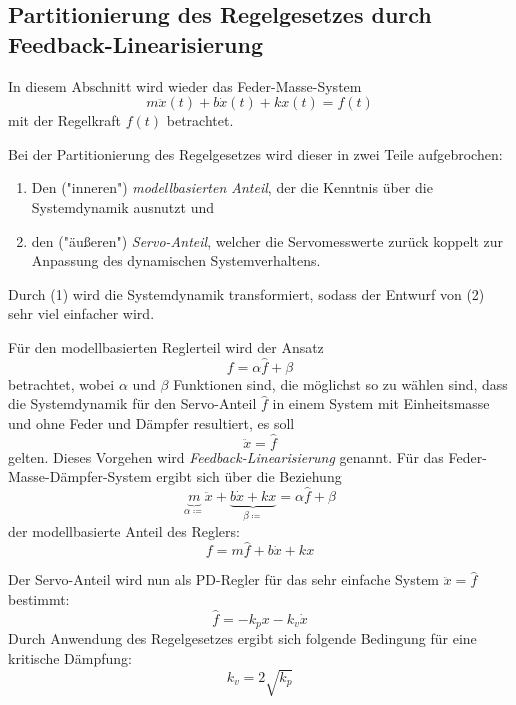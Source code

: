 		\subsection{Partitionierung des Regelgesetzes durch Feedback-Linearisierung}
			\label{sec:feedbacklinearization}

			In diesem Abschnitt wird wieder das Feder-Masse-System
			\begin{equation*}
				m\ddot{x}(t) + b\dot{x}(t) + kx(t) = f(t)
			\end{equation*}
			mit der Regelkraft \( f(t) \) betrachtet.

			Bei der Partitionierung des Regelgesetzes wird dieser in zwei Teile aufgebrochen:
			\begin{enumerate}
				\item Den ("inneren") \emph{modellbasierten Anteil}, der die Kenntnis über die Systemdynamik ausnutzt und
				\item den ("äußeren") \emph{Servo-Anteil}, welcher die Servomesswerte zurück koppelt zur Anpassung des dynamischen Systemverhaltens.
			\end{enumerate}
			Durch (1) wird die Systemdynamik transformiert, sodass der Entwurf von (2) sehr viel einfacher wird.

			Für den modellbasierten Reglerteil wird der Ansatz
			\begin{equation*}
				f = \alpha \hat{f} + \beta
			\end{equation*}
			betrachtet, wobei \( \alpha \) und \( \beta \) Funktionen sind, die möglichst so zu wählen sind, dass die Systemdynamik für den Servo-Anteil \( \hat{f} \) in einem System mit Einheitsmasse und ohne Feder und Dämpfer resultiert, \dh es soll
			\begin{equation*}
				\ddot{x} = \hat{f}
			\end{equation*}
			gelten. Dieses Vorgehen wird \emph{Feedback-Linearisierung} genannt. Für das Feder-Masse-Dämpfer-System ergibt sich über die Beziehung
			\begin{equation*}
				\underbrace{m}_{\alpha \coloneqq}\ddot{x} + \underbrace{b\dot{x} + kx}_{\beta \coloneqq} = \alpha \hat{f} + \beta
			\end{equation*}
			der modellbasierte Anteil des Reglers:
			\begin{equation*}
				f = m \hat{f} + b\dot{x} + kx
			\end{equation*}

			Der Servo-Anteil wird nun als PD-Regler für das sehr einfache System \( \ddot{x} = \hat{f} \) bestimmt:
			\begin{equation*}
				\hat{f} = -k_p x - k_v \dot{x}
			\end{equation*}
			Durch Anwendung des Regelgesetzes ergibt sich folgende Bedingung für eine kritische Dämpfung:
			\begin{equation*}
				k_v = 2 \sqrt{k_p}
			\end{equation*}

